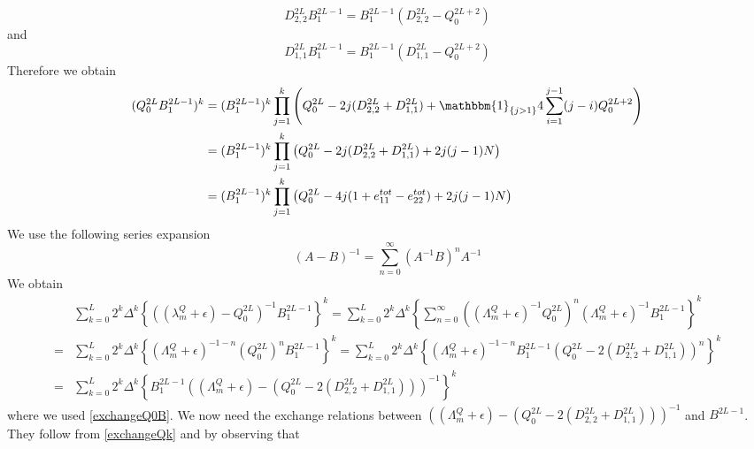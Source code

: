 \documentclass[10pt]{article}
\numberwithin{equation}{section}
\numberwithin{equation}{subsection}
\begin{document}
\begin{equation}
	D_{2,2}^{2L}B_{1}^{2L-1}=B_{1}^{2L-1}\left(D_{2,2}^{2L}-Q_{0}^{2L+2}\right)
\end{equation}
and 
\begin{equation}
	D_{1,1}^{2L}B_{1}^{2L-1}=B_{1}^{2L-1}\left(D_{1,1}^{2L}-Q_{0}^{2L+2}\right)
\end{equation}
Therefore we obtain 
\begin{equation}\label{exchangeQk}
	\begin{split}
		(Q_{0}^{2L}B_{1}^{2L-1})^{k}&=(B_{1}^{2L-1})^{k}\prod_{j=1}^{k}\left(Q_{0}^{2L}-2j(D_{2,2}^{2L}+D_{1,1}^{2L})+\mathbbm{1}_{\{j>1\}}4\sum_{i=1}^{j-1}(j-i)Q_{0}^{2L+2}\right)\\
		&=(B_{1}^{2L-1})^{k}\prod_{j=1}^{k}\left(Q_{0}^{2L}-2j(D_{2,2}^{2L}+D_{1,1}^{2L})+2j(j-1)N\right)\\
		&=(B_{1}^{2L-1})^{k}\prod_{j=1}^{k}\left(Q_{0}^{2L}-4j(1+e_{11}^{tot}-e_{22}^{tot})+2j(j-1)N\right)
	\end{split}
\end{equation}
We use the following series expansion
\begin{equation}\label{veryUsefulSeries}
	(A-B)^{-1}=\sum_{n=0}^{\infty}(A^{-1}B)^{n}A^{-1}
\end{equation}
We obtain
\begin{equation}
	\begin{split}
		&\sum_{k=0}^{L}2^{k}\Delta^{k}\left\{\left((\lambda_{m}^{Q}+\epsilon)-Q_{0}^{2L}\right)^{-1}B_{1}^{2L-1}\right\}^{k}=\sum_{k=0}^{L}2^{k}\Delta^{k}\left\{\sum_{n=0}^{\infty}\left((\Lambda_{m}^{Q}+\epsilon)^{-1}Q_{0}^{2L}\right)^{n}(\Lambda_{m}^{Q}+\epsilon)^{-1}B_{1}^{2L-1}\right\}^{k}\\
		=&
		\sum_{k=0}^{L}2^{k}\Delta^{k}\left\{(\Lambda_{m}^{Q}+\epsilon)^{-1-n}(Q_{0}^{2L})^{n}B_{1}^{2L-1}\right\}^{k}=\sum_{k=0}^{L}2^{k}\Delta^{k}\left\{(\Lambda_{m}^{Q}+\epsilon)^{-1-n}B_{1}^{2L-1}\left(Q_{0}^{2L}-2(D_{2,2}^{2L}+D_{1,1}^{2L})\right)^{n}\right\}^{k}
		\\=&
		\sum_{k=0}^{L}2^{k}\Delta^{k}\left\{B_{1}^{2L-1}\left((\Lambda_{m}^{Q}+\epsilon)-\left(Q_{0}^{2L}-2(D_{2,2}^{2L}+D_{1,1}^{2L})\right)\right)^{-1}\right\}^{k}
	\end{split}
\end{equation}
where we used \eqref{exchangeQ0B}. We now need the exchange relations between $\left((\Lambda_{m}^{Q}+\epsilon)-\left(Q_{0}^{2L}-2(D_{2,2}^{2L}+D_{1,1}^{2L})\right)\right)^{-1}$ and $B^{2L-1}$. They follow from \eqref{exchangeQk} and by observing that 
\end{document}
